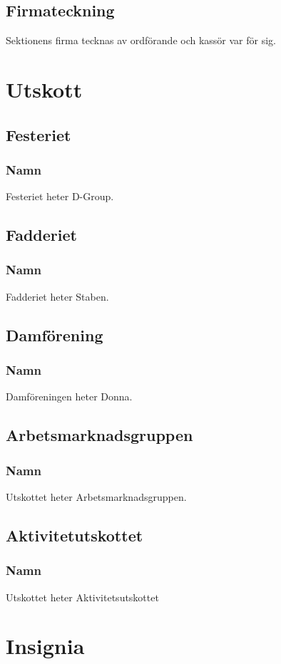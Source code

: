\documentclass{datateknologsektionen-document}
\begin{document}
\subsection{Firmateckning}
Sektionens firma tecknas av ordförande och kassör var för sig.

\section{Utskott}
\label{utskott}
\subsection{Festeriet}
\subsubsection{Namn}
Festeriet heter D-Group.
\subsection{Fadderiet}
\subsubsection{Namn}
Fadderiet heter Staben.
\subsection{Damförening}
\subsubsection{Namn}
Damföreningen heter Donna.
\subsection{Arbetsmarknadsgruppen}
\subsubsection{Namn}
Utskottet heter Arbetsmarknadsgruppen.
\subsection{Aktivitetutskottet}
\subsubsection{Namn}
Utskottet heter Aktivitetsutskottet

\section{Insignia}
\end{document}
